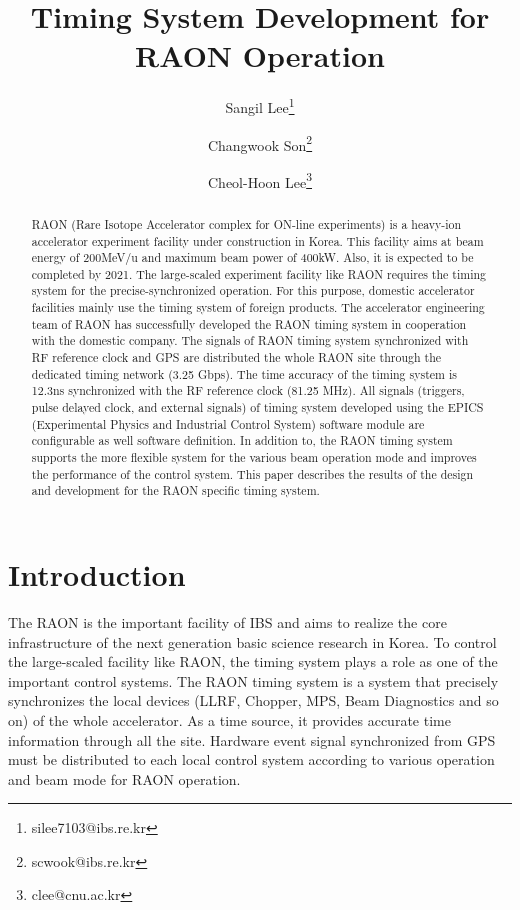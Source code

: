 \documentclass[11pt,a4paper]{article}
\begin{document}
\title{
\textbf{Timing System Development for RAON Operation} %
\vspace{0.5cm}
\Large
}
\author[1]{Sangil Lee\thanks{silee7103@ibs.re.kr}}
\author[2]{Changwook Son\thanks{scwook@ibs.re.kr}}
\author[3]{Cheol-Hoon Lee\thanks{clee@cnu.ac.kr}}
\date{}
\maketitle
\vspace{2em}

\begin{abstract}
RAON (Rare Isotope Accelerator complex for ON-line experiments) is a heavy-ion accelerator experiment facility under construction in Korea. This facility aims at beam energy of 200MeV/u and maximum beam power of 400kW. Also, it is expected to be completed by 2021. The large-scaled experiment facility like RAON requires the timing system for the precise-synchronized operation. For this purpose, domestic accelerator facilities mainly use the timing system of foreign products. The accelerator engineering team of RAON has successfully developed the RAON timing system in cooperation with the domestic company. The signals of RAON timing system synchronized with RF reference clock and GPS are distributed the whole RAON site through the dedicated timing network (3.25 Gbps). The time accuracy of the timing system is 12.3ns synchronized with the RF reference clock (81.25 MHz). All signals (triggers, pulse delayed clock, and external signals) of timing system developed using the EPICS (Experimental Physics and Industrial Control System) software module are configurable as well software definition. In addition to, the RAON timing system supports the more flexible system for the various beam operation mode and improves the performance of the control system. \newline
This paper describes the results of the design and development for the RAON specific timing system.
\end{abstract}

\section{Introduction}
The RAON is the important facility of IBS and aims to realize the core infrastructure of the next generation basic science research in Korea. To control the large-scaled facility like RAON, the timing system plays a role as one of the important control systems. The RAON timing system is a system that precisely synchronizes the local devices (LLRF, Chopper, MPS, Beam Diagnostics and so on) of the whole accelerator. 
As a time source, it provides accurate time information through all the site.
Hardware event signal synchronized from GPS must be distributed to each local control system according to various operation and beam mode for RAON operation.
\end{document}
